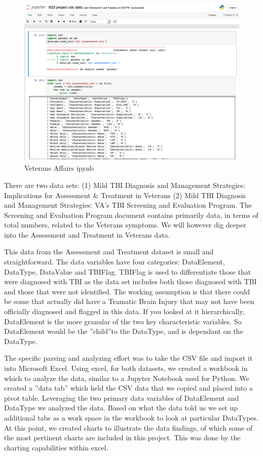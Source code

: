 \documentclass[sigconf]{acmart}
\begin{document}
\begin{figure}[h]
\includegraphics[width=\columnwidth]{images/graph4.png}
\caption{Veterans Affairs ipynb}\label{f:Veterans Affairs ipynb}
\end{figure}

There are two data sets: (1) Mild TBI Diagnosis and Management Strategies: Implications for Assessment \& Treatment in Veterans (2) Mild TBI Diagnosis and Management Strategies: VA's TBI Screening and Evaluation Program. The Screening and Evaluation Program document contains primarily data, in terms of total numbers, related to the Veterans symptoms.  We will however dig deeper into the Assessment and Treatment in Veterans data.

This data from the Assessment and Treatment dataset is small and straightforward.  The data variables have four categories: DataElement, DataType, DataValue and TBIFlag.  TBIFlag is used to differentiate those that were diagnosed with TBI as the data set includes both those diagnosed with TBI and those that were not identified.  The working assumption is that there could be some that actually did have a Tramatic Brain Injury that may not have been officially diagnosed and flagged in this data. If you looked at it hierarchically, DataElement is the more granular of the two key characteristic variables.  So DataElement would be the ''child''to the DataType, and is dependant on the DataType. 

The specific parsing and analyzing effort was to take the CSV file and import it into Microsoft Excel.  Using excel, for both datasets, we created a workbook in which to analyze the data, similar to a Jupyter Notebook used for Python.  We created a ''data tab'' which held the CSV data that we copied and placed into a pivot table.  Leveraging the two primary data variables of DataElement and DataType we analyzed the data.  Based on what the data told us we set up additional tabs as a work space in the workbook to look at particular DataTypes.  At this point, we created charts to illustrate the data findings, of which some of the most pertinent charts are included in this project.  This was done by the charting capabilities within excel.
\end{document}
